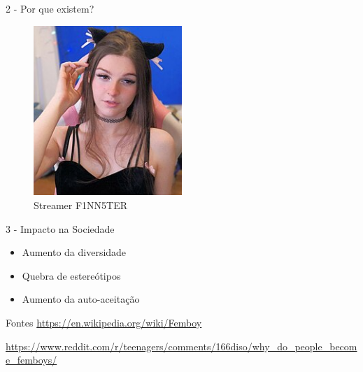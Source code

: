 \documentclass{beamer}
\begin{document}
\begin{frame}{2 - Por que existem?}
   \begin{figure}
         \centering
         \includegraphics[width=0.5\textwidth]{finn.jpg}
         \caption{Streamer F1NN5TER}
   \end{figure} 
\end{frame}

\begin{frame}{3 - Impacto na Sociedade}
    \begin{itemize}
        \item Aumento da diversidade
        \item Quebra de estereótipos
        \item Aumento da auto-aceitação
    \end{itemize}
    
\end{frame}


\begin{frame}{Fontes}
    \url{https://en.wikipedia.org/wiki/Femboy}
    


    \url{https://www.reddit.com/r/teenagers/comments/166diso/why_do_people_become_femboys/}
\end{frame}
\end{document}

